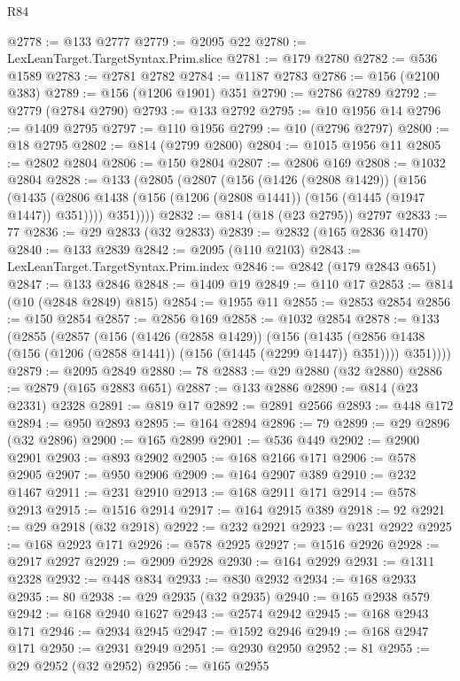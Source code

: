 \begin{lexlean}{R84}
\begin{coremodule}
@2778 := @133 @2777
@2779 := @2095 @22
@2780 := LexLeanTarget.TargetSyntax.Prim.slice
@2781 := @179 @2780
@2782 := @536 @1589
@2783 := @2781 @2782
@2784 := @1187 @2783
@2786 := @156 (@2100 @383)
@2789 := @156 (@1206 @1901) @351
@2790 := @2786 @2789
@2792 := @2779 (@2784 @2790)
@2793 := @133 @2792
@2795 := @10 @1956 @14
@2796 := @1409 @2795
@2797 := @110 @1956
@2799 := @10 (@2796 @2797)
@2800 := @18 @2795
@2802 := @814 (@2799 @2800)
@2804 := @1015 @1956 @11
@2805 := @2802 @2804
@2806 := @150 @2804
@2807 := @2806 @169
@2808 := @1032 @2804
@2828 := @133
    (@2805
      (@2807
        (@156
          (@1426 (@2808 @1429))
          (@156
            (@1435 (@2806 @1438 (@156 (@1206 (@2808 @1441)) (@156 (@1445 (@1947 @1447)) @351))))
            @351))))
@2832 := @814 (@18 (@23 @2795)) @2797
@2833 := 77
@2836 := @29 @2833 (@32 @2833)
@2839 := @2832 (@165 @2836 @1470)
@2840 := @133 @2839
@2842 := @2095 (@110 @2103)
@2843 := LexLeanTarget.TargetSyntax.Prim.index
@2846 := @2842 (@179 @2843 @651)
@2847 := @133 @2846
@2848 := @1409 @19
@2849 := @110 @17
@2853 := @814 (@10 (@2848 @2849) @815)
@2854 := @1955 @11
@2855 := @2853 @2854
@2856 := @150 @2854
@2857 := @2856 @169
@2858 := @1032 @2854
@2878 := @133
    (@2855
      (@2857
        (@156
          (@1426 (@2858 @1429))
          (@156
            (@1435 (@2856 @1438 (@156 (@1206 (@2858 @1441)) (@156 (@1445 (@2299 @1447)) @351))))
            @351))))
@2879 := @2095 @2849
@2880 := 78
@2883 := @29 @2880 (@32 @2880)
@2886 := @2879 (@165 @2883 @651)
@2887 := @133 @2886
@2890 := @814 (@23 @2331) @2328
@2891 := @819 @17
@2892 := @2891 @2566
@2893 := @448 @172
@2894 := @950 @2893
@2895 := @164 @2894
@2896 := 79
@2899 := @29 @2896 (@32 @2896)
@2900 := @165 @2899
@2901 := @536 @449
@2902 := @2900 @2901
@2903 := @893 @2902
@2905 := @168 @2166 @171
@2906 := @578 @2905
@2907 := @950 @2906
@2909 := @164 @2907 @389
@2910 := @232 @1467
@2911 := @231 @2910
@2913 := @168 @2911 @171
@2914 := @578 @2913
@2915 := @1516 @2914
@2917 := @164 @2915 @389
@2918 := 92
@2921 := @29 @2918 (@32 @2918)
@2922 := @232 @2921
@2923 := @231 @2922
@2925 := @168 @2923 @171
@2926 := @578 @2925
@2927 := @1516 @2926
@2928 := @2917 @2927
@2929 := @2909 @2928
@2930 := @164 @2929
@2931 := @1311 @2328
@2932 := @448 @834
@2933 := @830 @2932
@2934 := @168 @2933
@2935 := 80
@2938 := @29 @2935 (@32 @2935)
@2940 := @165 @2938 @579
@2942 := @168 @2940 @1627
@2943 := @2574 @2942
@2945 := @168 @2943 @171
@2946 := @2934 @2945
@2947 := @1592 @2946
@2949 := @168 @2947 @171
@2950 := @2931 @2949
@2951 := @2930 @2950
@2952 := 81
@2955 := @29 @2952 (@32 @2952)
@2956 := @165 @2955

\end{coremodule}
\end{lexlean}
